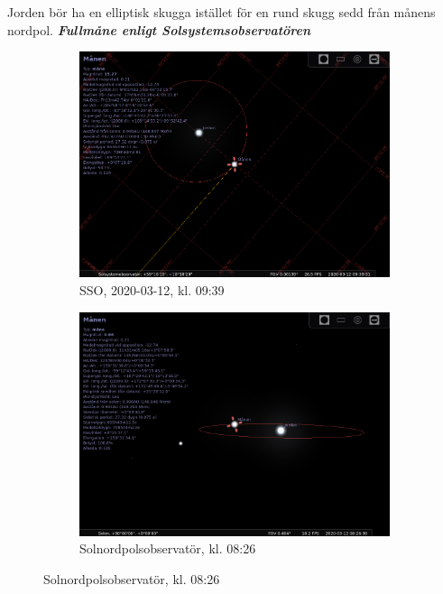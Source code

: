 \documentclass[./exercises.tex]{subfiles}
\begin{document}
\begin{itemize}
Jorden bör ha en elliptisk skugga istället för en rund skugg sedd från 
månens nordpol.
\newpage
\textit{\textbf{Fullmåne enligt Solsystemsobservatören}}
\begin{figure}[H]
     \centering
     \begin{subfigure}[b]{0.45\textwidth}
         \centering
         \includegraphics[width=\textwidth]{Stellarium1/SSONewMoon/stellarium-000.png}
         \caption{SSO, 2020-03-12, kl. 09:39}
         \label{fig:y equals x}
     \end{subfigure}
     \hfill
     \begin{subfigure}[b]{0.45\textwidth}
         \centering
         \includegraphics[width=\textwidth]{Stellarium1/SSONewMoon/stellarium-001.png}
         \caption{Solnordpolsobservatör, kl. 08:26}

\end{subfigure}
\end{figure}
\end{itemize}
\end{document}
